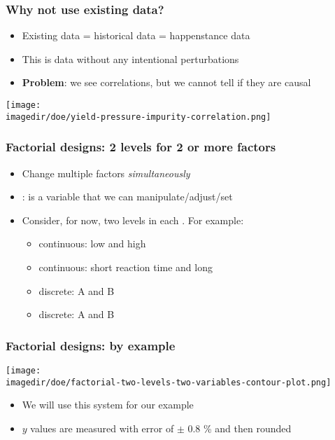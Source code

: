 \begin{frame}\frametitle{Why not use existing data?}
	\begin{itemize}
		\item	Existing data = historical data = happenstance data
		\item	This is data without any intentional perturbations
		\item	\textbf{Problem}: we see correlations, but we cannot tell if they are causal
	\end{itemize}
	\texttt{[image: \\imagedir/doe/yield-pressure-impurity-correlation.png]}
\end{frame}

\begin{frame}\frametitle{Factorial designs: 2 levels for 2 or more factors}
	\begin{itemize}
		\item	Change multiple factors \emph{simultaneously}
		\item	{\color{purple}{Factor}}: is a variable that we can manipulate/adjust/set
		\item	Consider, for now, two levels in each \textbf{{\color{myOrange}{factor}}}. For example:
		\begin{itemize}
			\item	continuous: low and high {\color{myOrange}{pH}}
			\item	continuous: short reaction time and long {\color{myOrange}{reaction time}}
			\item	discrete: {\color{myOrange}{catalyst}} A and B
			\item	discrete: {\color{myOrange}{mixing system}} A and B
		\end{itemize}
	\end{itemize}
\end{frame}

\begin{frame}\frametitle{Factorial designs: by example}
	\begin{center}
		\texttt{[image: \\imagedir/doe/factorial-two-levels-two-variables-contour-plot.png]}
	\end{center}
	\begin{itemize}
		\item	We will use this system for our example
		\item	$y$ values are measured with error of $\pm$ 0.8 \% and then rounded
	\end{itemize}
\end{frame}

